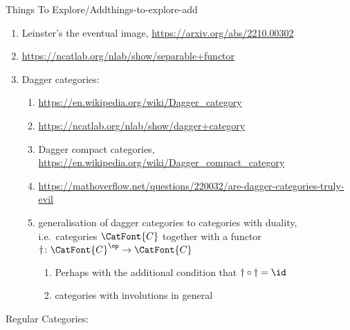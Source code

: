 \begin{remark}{Things To Explore/Add}{things-to-explore-add}
\begin{enumerate}
\begin{enumerate}
                \item \url{https://ncatlab.org/nlab/show/Schur+functor}
                    \begin{enumerate}
                        \item Equivalence between twisted commutative algebras and algebras on categories of polynomial functors, \url{https://mathweb.ucsd.edu/~ssam/talks/2014/ihp-tca.pdf}
                    \end{enumerate}
                \item \url{https://mathoverflow.net/questions/22462/what-are-some-examples-of-interesting-uses-of-the-theory-of-combinatorial-specie}
                \item \url{https://en.wikipedia.org/wiki/Combinatorial_species}
            \end{enumerate}
        \item Leinster's the eventual image, \url{https://arxiv.org/abs/2210.00302}
        \item \url{https://ncatlab.org/nlab/show/separable+functor}
        \item Dagger categories:
            \begin{enumerate}
                \item \url{https://en.wikipedia.org/wiki/Dagger_category}
                \item \url{https://ncatlab.org/nlab/show/dagger+category}
                \item Dagger compact categories, \url{https://en.wikipedia.org/wiki/Dagger_compact_category}
                \item \url{https://mathoverflow.net/questions/220032/are-dagger-categories-truly-evil}
                \item generalisation of dagger categories to categories with duality, i.e.\ categories $\CatFont{C}$ together with a functor $\dagger\colon\CatFont{C}^{\op}\to\CatFont{C}$
                    \begin{enumerate}
                        \item Perhaps with the additional condition that $\dagger\circ\dagger=\id$
                        \item categories with involutions in general
                    \end{enumerate}
            \end{enumerate}
    \end{enumerate}
    Regular Categories:
    \begin{enumerate}

\end{enumerate}
\end{remark}
